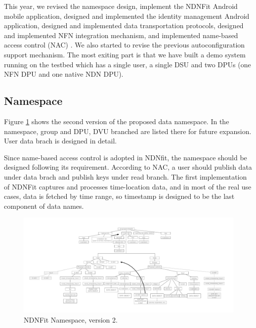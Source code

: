 \documentclass{article}
\begin{document}
This year, we revised the namespace design, implement the NDNFit Android mobile application, designed and implemented the identity management Android application, designed and implemented data transportation protocols, designed and implemented NFN integration mechanism, and implemented name-based access control (NAC) \cite{yu2015name}. We also started to revise the previous autoconfiguration support mechanism. The most exiting part is that we have built a demo system running on the testbed which has a single user, a single DSU and two DPUs (one NFN DPU and one native NDN DPU).

\subsection{Namespace}

Figure \ref{fig:namespace} shows the second version of the proposed data namespace. In the namespace, group and DPU, DVU branched are listed there for future expansion. User data brach is designed in detail.

Since name-based access control is adopted in NDNfit, the namespace should be designed following its requirement. According to NAC, a user should publish data under data brach and publish keys under read branch. The first implementation of NDNFit captures and processes time-location data, and in most of the real use cases, data is fetched by time range, so timestamp is designed to be the last component of data names.

\begin{figure}
	\begin{center}
		\includegraphics[width=1\textwidth]{namespace3.pdf}
		\caption{NDNFit Namespace, version 2.}
		\label{fig:namespace}
	\end{center}
\end{figure}
\end{document}
